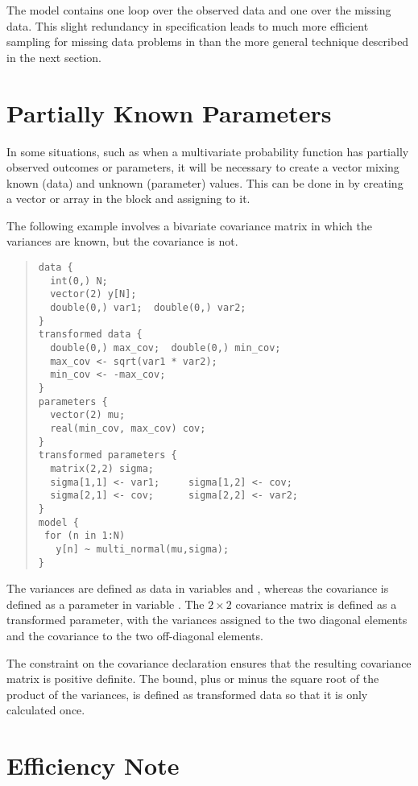 The model contains one loop over the observed data and one over the
missing data.  This slight redundancy in specification leads to much
more efficient sampling for missing data problems in \Stan than the
more general technique described in the next section.


\section{Partially Known Parameters}\label{partially-known-parameters.section}

In some situations, such as when a multivariate probability function
has partially observed outcomes or parameters, it will be necessary to
create a vector mixing known (data) and unknown (parameter) values.
This can be done in \Stan by creating a vector or array in the
 block and assigning to it.

The following example involves a bivariate covariance matrix in which the
variances are known, but the covariance is not.
%
\begin{quote}
\begin{Verbatim}
data {
  int(0,) N;
  vector(2) y[N];
  double(0,) var1;  double(0,) var2;
}
transformed data {
  double(0,) max_cov;  double(0,) min_cov;   
  max_cov <- sqrt(var1 * var2);  
  min_cov <- -max_cov;
}
parameters {
  vector(2) mu;
  real(min_cov, max_cov) cov;
}
transformed parameters {
  matrix(2,2) sigma;
  sigma[1,1] <- var1;     sigma[1,2] <- cov;
  sigma[2,1] <- cov;      sigma[2,2] <- var2;
}  
model {
 for (n in 1:N)
   y[n] ~ multi_normal(mu,sigma);
}
\end{Verbatim}
\end{quote}
%
The variances are defined as data in variables  and
, whereas the covariance is defined as a parameter in
variable .  The $2 \times 2$ covariance matrix
 is defined as a transformed parameter, with the variances
assigned to the two diagonal elements and the covariance to the two
off-diagonal elements.

The constraint on the covariance declaration ensures that the
resulting covariance matrix  is positive definite.  The
bound, plus or minus the square root of the product of the variances,
is defined as transformed data so that it is only calculated once.

\section{Efficiency Note}

